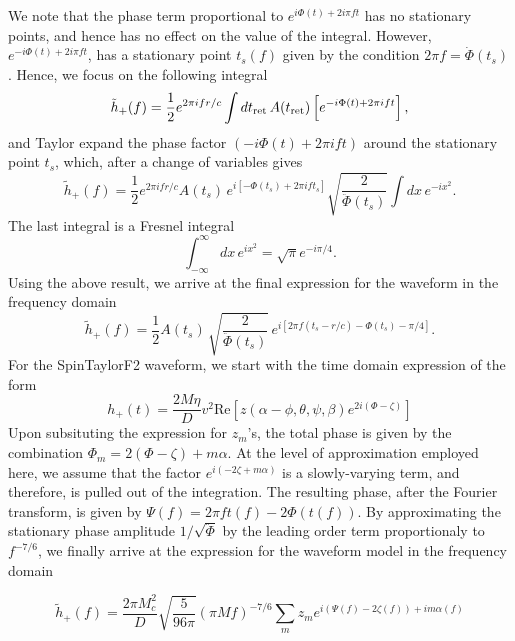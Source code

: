 We note that the phase term proportional to $e^{i \Phi(t) + 2 i \pi f
t}$ has no stationary points, and hence has no effect on the value of the
integral. However, $e^{-i \Phi(t) + 2 i \pi f t}$, has a stationary
point $t_s (f)$ given by the condition $2 \pi f = \dot{\Phi}(t_s)$. Hence, we 
focus on the following integral
\begin{equation}
\tilde{h}_{+}(f) = \dfrac{1}{2} e^{2\pi i f r/c} \int dt_{\rm ret}\, A(t_{\rm ret})
 \left[e^{-i \Phi(t) + 2\pi i f t} \right]  \nonumber,
\end{equation}
and Taylor expand the phase factor $(-i \Phi(t) + 2\pi i f t)$ around the
stationary point $t_s$, which, after a change of variables gives
\begin{equation}
\tilde{h}_{+}(f) = \dfrac{1}{2} e^{2\pi i f r/c} A(t_{s})\,
e^{i  \left[-\Phi(t_s) + 2\pi i f t_s\right]} 
\sqrt{\dfrac{2}{\ddot{\Phi}(t_s)}}\int dx\, e^{-i x^2}.
\end{equation}
The last integral is a Fresnel integral
\begin{equation}
\int_{-\infty}^{\infty} dx\, e^{i x^2} =  \sqrt{\pi} e^{-i\pi/4}.
\end{equation}
Using the above result, we arrive at the final expression for the waveform in
the frequency domain
\begin{equation}
\tilde{h}_{+}(f) = \dfrac{1}{2} A(t_{s})\,\sqrt{\dfrac{2}{\ddot{\Phi}(t_s)}}\,
e^{i\left[2\pi f(t_s - r/c) - \Phi(t_s) - \pi/4 \right]}.
\end{equation}
For the SpinTaylorF2 waveform, we start with the time domain expression of the
form
\begin{equation}
h_{+}(t) = \dfrac{2 M \eta}{D}v^2 \text{Re} \left[z(\alpha - \phi, \theta,
\psi, \beta) e^{2 i (\Phi - \zeta)}\right]
\end{equation}
Upon subsituting the expression for $z_m$'s, the total phase is given by the
combination $\Phi_m = 2 (\Phi - \zeta) + m \alpha$. At the level of
approximation employed here, we assume that the factor $e^{i(-2\zeta +
m\alpha)}$ is a slowly-varying term, and therefore, is pulled out of the
integration. The resulting phase, after the Fourier transform, is given by
$\Psi(f) = 2\pi f t(f) - 2\Phi(t(f))$. By approximating the stationary phase
amplitude $1/\sqrt{\ddot\Phi}$ by the leading order term proportionaly to
$f^{-7/6}$, we finally arrive at the expression for the waveform model in the
frequency domain

\begin{equation}
\tilde{h}_{+}(f) = \dfrac{2\pi M_{c}^{2}}{D}\sqrt{\dfrac{5}{96\pi}}(\pi M
f)^{-7/6}\sum_{m}z_{m}e^{i(\Psi(f) - 2\zeta(f)) + i m \alpha(f)}
\end{equation}